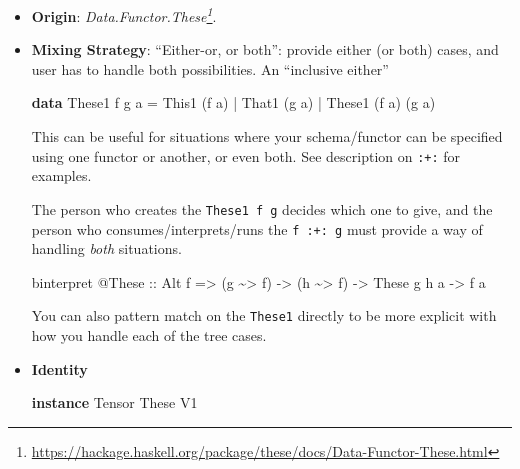 \documentclass[]{article}
\newenvironment{Shaded}{}{}
\newcommand{\DataTypeTok}[1]{\textcolor[rgb]{0.56,0.13,0.00}{#1}}
\newcommand{\KeywordTok}[1]{\textcolor[rgb]{0.00,0.44,0.13}{\textbf{#1}}}
\newcommand{\NormalTok}[1]{#1}
\newcommand{\OperatorTok}[1]{\textcolor[rgb]{0.40,0.40,0.40}{#1}}
\newcommand{\OtherTok}[1]{\textcolor[rgb]{0.00,0.44,0.13}{#1}}
\renewcommand{\href}[2]{#2\footnote{\url{#1}}}
\begin{document}
\begin{itemize}
\item
  \textbf{Origin}:
  \emph{\href{https://hackage.haskell.org/package/these/docs/Data-Functor-These.html}{Data.Functor.These}}.
\item
  \textbf{Mixing Strategy}: ``Either-or, or both'': provide either (or both)
  cases, and user has to handle both possibilities. An ``inclusive either''

\begin{Shaded}
\begin{Highlighting}[]
\KeywordTok{data} \DataTypeTok{These1}\NormalTok{ f g a}
    \OtherTok{=} \DataTypeTok{This1}\NormalTok{  (f a)}
    \OperatorTok{|} \DataTypeTok{That1}\NormalTok{        (g a)}
    \OperatorTok{|} \DataTypeTok{These1}\NormalTok{ (f a) (g a)}
\end{Highlighting}
\end{Shaded}

  This can be useful for situations where your schema/functor can be specified
  using one functor or another, or even both. See description on \texttt{:+:}
  for examples.

  The person who creates the \texttt{These1\ f\ g} decides which one to give,
  and the person who consumes/interprets/runs the \texttt{f\ :+:\ g} must
  provide a way of handling \emph{both} situations.

\begin{Shaded}
\begin{Highlighting}[]
\NormalTok{binterpret }\OperatorTok{@}\DataTypeTok{These}
\OtherTok{    ::} \DataTypeTok{Alt}\NormalTok{ f}
    \OtherTok{=>}\NormalTok{ (g }\OperatorTok{\textasciitilde{}>}\NormalTok{ f)}
    \OtherTok{{-}>}\NormalTok{ (h }\OperatorTok{\textasciitilde{}>}\NormalTok{ f)}
    \OtherTok{{-}>} \DataTypeTok{These}\NormalTok{ g h a}
    \OtherTok{{-}>}\NormalTok{ f a}
\end{Highlighting}
\end{Shaded}

  You can also pattern match on the \texttt{These1} directly to be more explicit
  with how you handle each of the tree cases.
\item
  \textbf{Identity}

\begin{Shaded}
\begin{Highlighting}[]
\KeywordTok{instance} \DataTypeTok{Tensor} \DataTypeTok{These} \DataTypeTok{V1}
\end{Highlighting}
\end{Shaded}


\end{itemize}
\end{document}
